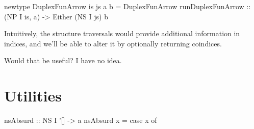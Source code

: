 \begin{code}
newtype DuplexFunArrow is js a b = DuplexFunArrow
    { runDuplexFunArrow :: (NP I is, a) -> Either (NS I js) b }
\end{code}

Intuitively, the structure traversals would provide additional
information in indices, and we'll be able to alter it by optionally
returning coindices.

Would that be useful? I have no idea.

\appendix

\section{Utilities}

\begin{code}
nsAbsurd :: NS I '[] -> a
nsAbsurd x = case x of {}
\end{code}
